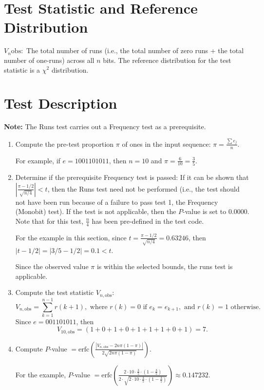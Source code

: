 \documentclass[12pt,openany]{book}
\theoremstyle{definition}
\begin{document}
	\newpage
	
	
	\section*{Test Statistic and Reference Distribution}
	\( V_n\text{obs}: \) The total number of runs (i.e., the total number of zero runs + the total number of one-runs) across all \( n \) bits.
	The reference distribution for the test statistic is a \( \chi^2 \) distribution.
	
	\section*{Test Description}
	\textbf{Note:} The Runs test carries out a Frequency test as a prerequisite.
	\begin{enumerate}
		\item Compute the pre-test proportion \( \pi \) of ones in the input sequence: \( \pi = \frac{\sum e_j}{n} \).
		
		For example, if \( e = 1001101011 \), then \( n=10 \) and \( \pi = \frac{6}{10} = \frac{3}{5} \).
		
		\item Determine if the prerequisite Frequency test is passed: If it can be shown that \( | \frac{\pi - 1/2}{\sqrt{n/4}} | < t \), then the Runs test need not be performed (i.e., the test should not have been run because of a failure to pass test 1, the Frequency (Monobit) test). If the test is not applicable, then the \( P \)-value is set to 0.0000. Note that for this test, \( \frac{n}{4} \) has been pre-defined in the test code.
		
		For the example in this section, since \( t = \frac{\pi - 1/2}{\sqrt{n/4}} = 0.63246 \), then \( |t - 1/2| = |3/5 - 1/2| = 0.1 < t \).
		
		Since the observed value \( \pi \) is within the selected bounds, the runs test is applicable.
	\end{enumerate}

	\begin{enumerate}
		\setcounter{enumi}{2} %
		\item Compute the test statistic \( V_{n,\text{obs}} \):
		\[
		V_{n,\text{obs}} = \sum_{k=1}^{n-1} r(k+1), \text{ where } r(k)=0 \text{ if } e_k = e_{k+1}, \text{ and } r(k)=1 \text{ otherwise}.
		\]
		Since \( e = 001101011 \), then
		\[
		V_{10,\text{obs}} = (1+0+1+0+1+1+1+0+1) = 7.
		\]
		
		\item Compute \( P \)-value \( = \text{erfc} \left( \frac{|V_{n,\text{obs}} - 2n\pi(1 - \pi)|}{2\sqrt{2n\pi(1 - \pi)}} \right) \).
		
		For the example, \( P \)-value \( = \text{erfc} \left( \frac{2 \cdot 10 \cdot \frac{3}{5} \cdot \left(1 - \frac{3}{5}\right)}{2 \cdot \sqrt{2 \cdot 10 \cdot \frac{3}{5} \cdot \left(1 - \frac{3}{5}\right)}} \right) \approx 0.147232.
		\)
	\end{enumerate}
	
\end{document}
